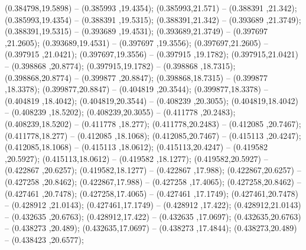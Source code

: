  (0.384798,19.5898) -- (0.385993 ,19.4354);
 (0.385993,21.571) -- (0.388391 ,21.342);
 (0.385993,19.4354) -- (0.388391 ,19.5315);
 (0.388391,21.342) -- (0.393689 ,21.3749);
 (0.388391,19.5315) -- (0.393689 ,19.4531);
 (0.393689,21.3749) -- (0.397697 ,21.2605);
 (0.393689,19.4531) -- (0.397697 ,19.3556);
 (0.397697,21.2605) -- (0.397915 ,21.0421);
 (0.397697,19.3556) -- (0.397915 ,19.1782);
 (0.397915,21.0421) -- (0.398868 ,20.8774);
 (0.397915,19.1782) -- (0.398868 ,18.7315);
 (0.398868,20.8774) -- (0.399877 ,20.8847);
 (0.398868,18.7315) -- (0.399877 ,18.3378);
 (0.399877,20.8847) -- (0.404819 ,20.3544);
 (0.399877,18.3378) -- (0.404819 ,18.4042);
 (0.404819,20.3544) -- (0.408239 ,20.3055);
 (0.404819,18.4042) -- (0.408239 ,18.5202);
 (0.408239,20.3055) -- (0.411778 ,20.2483);
 (0.408239,18.5202) -- (0.411778 ,18.277);
 (0.411778,20.2483) -- (0.412085 ,20.7467);
 (0.411778,18.277) -- (0.412085 ,18.1068);
 (0.412085,20.7467) -- (0.415113 ,20.4247);
 (0.412085,18.1068) -- (0.415113 ,18.0612);
 (0.415113,20.4247) -- (0.419582 ,20.5927);
 (0.415113,18.0612) -- (0.419582 ,18.1277);
 (0.419582,20.5927) -- (0.422867 ,20.6257);
 (0.419582,18.1277) -- (0.422867 ,17.988);
 (0.422867,20.6257) -- (0.427258 ,20.8462);
 (0.422867,17.988) -- (0.427258 ,17.4065);
 (0.427258,20.8462) -- (0.427461 ,20.7478);
 (0.427258,17.4065) -- (0.427461 ,17.1749);
 (0.427461,20.7478) -- (0.428912 ,21.0143);
 (0.427461,17.1749) -- (0.428912 ,17.422);
 (0.428912,21.0143) -- (0.432635 ,20.6763);
 (0.428912,17.422) -- (0.432635 ,17.0697);
 (0.432635,20.6763) -- (0.438273 ,20.489);
 (0.432635,17.0697) -- (0.438273 ,17.4844);
 (0.438273,20.489) -- (0.438423 ,20.6577);
